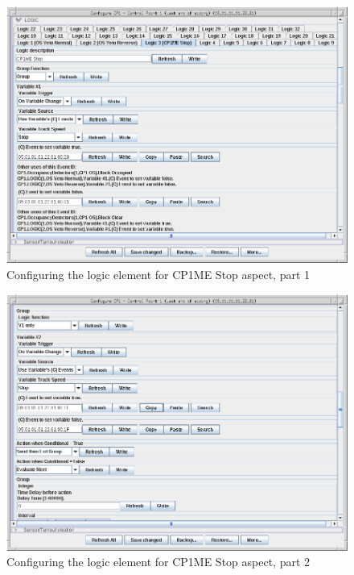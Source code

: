 \begin{figure}[hbpt]\begin{centering}%
\includegraphics[width=5in]{CP1ME-Stop-Logic-Config1.png}
\caption{Configuring the logic element for CP1ME Stop aspect, part 1}
\label{fig:CP1ME-Stop-Logic-Config1}
\end{centering}\end{figure}
\begin{figure}[hbpt]\begin{centering}%
\includegraphics[width=5in]{CP1ME-Stop-Logic-Config2.png}
\caption{Configuring the logic element for CP1ME Stop aspect, part 2}
\label{fig:CP1ME-Stop-Logic-Config2}
\end{centering}\end{figure}

